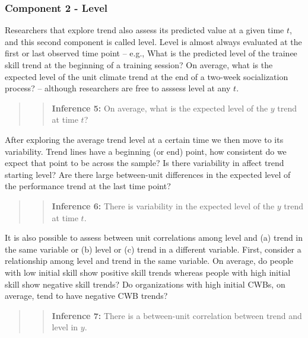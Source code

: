 \documentclass[english,,man]{apa6}
\begin{document}
\hypertarget{component-2---level}{%
\subsubsection{Component 2 - Level}\label{component-2---level}}

Researchers that explore trend also assess its predicted value at a given time \(t\), and this second component is called level. Level is almost always evaluated at the first or last observed time point -- e.g., What is the predicted level of the trainee skill trend at the beginning of a training session? On average, what is the expected level of the unit climate trend at the end of a two-week socialization process? -- although researchers are free to asssess level at any \(t\).

\begin{quote}
\begin{quote}
\textbf{Inference 5:} On average, what is the expected level of the \(y\) trend at time \(t\)?
\end{quote}
\end{quote}

After exploring the average trend level at a certain time we then move to its variability. Trend lines have a beginning (or end) point, how consistent do we expect that point to be across the sample? Is there variability in affect trend starting level? Are there large between-unit differences in the expected level of the performance trend at the last time point?

\begin{quote}
\begin{quote}
\textbf{Inference 6:} There is variability in the expected level of the \(y\) trend at time \(t\).
\end{quote}
\end{quote}

It is also possible to assess between unit correlations among level and (a) trend in the same variable or (b) level or (c) trend in a different variable. First, consider a relationship among level and trend in the same variable. On average, do people with low initial skill show positive skill trends whereas people with high initial skill show negative skill trends? Do organizations with high initial CWBs, on average, tend to have negative CWB trends?

\begin{quote}
\begin{quote}
\textbf{Inference 7:} There is a between-unit correlation between trend and level in \(y\).
\end{quote}
\end{quote}
\end{document}
